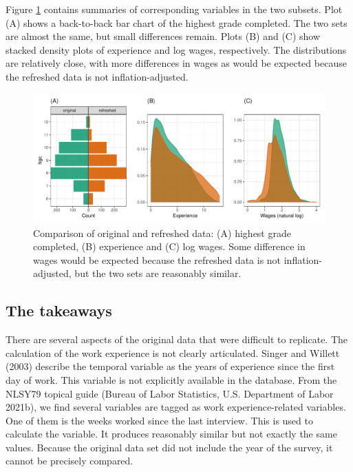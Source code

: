 \documentclass{article}
\begin{document}
Figure \ref{fig:compare-subsets} contains summaries of corresponding variables in the two subsets. Plot (A) shows a back-to-back bar chart of the highest grade completed. The two sets are almost the same, but small differences remain. Plots (B) and (C) show stacked density plots of experience and log wages, respectively. The distributions are relatively close, with more differences in wages as would be expected because the refreshed data is not inflation-adjusted.

\begin{figure}

{\centering \includegraphics[width=1\linewidth]{figures/compare-subsets-1} 

}

\caption{Comparison of original and refreshed data: (A) highest grade completed, (B) experience and (C) log wages. Some difference in wages would be expected because the refreshed data is not inflation-adjusted, but the two sets are reasonably similar.}\label{fig:compare-subsets}
\end{figure}

\hypertarget{takeaways}{%
\subsection{The takeaways}\label{takeaways}}

There are several aspects of the original data that were difficult to replicate. The calculation of the work experience is not clearly articulated. Singer and Willett (2003) describe the temporal variable as the years of experience since the first day of work. This variable is not explicitly available in the database. From the NLSY79 topical guide (Bureau of Labor Statistics, U.S. Department of Labor 2021b), we find several variables are tagged as work experience-related variables. One of them is the weeks worked since the last interview. This is used to calculate the variable. It produces reasonably similar but not exactly the same values. Because the original data set did not include the year of the survey, it cannot be precisely compared.
\end{document}
